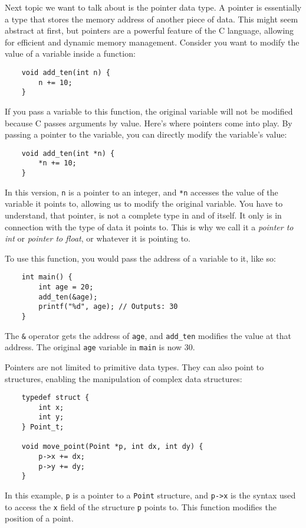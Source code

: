 \documentclass{dcbl/challenge}
\begin{document}
\begin{aufgabe}
    Next topic we want to talk about is the pointer data type. 
    A pointer is essentially a type that stores the memory address of another piece of data.
    This might seem abstract at first, but pointers are a powerful feature of the C language, allowing for efficient and dynamic memory management.
    Consider you want to modify the value of a variable inside a function:
\begin{lstlisting}
    void add_ten(int n) {
        n += 10;
    }
\end{lstlisting}
If you pass a variable to this function, the original variable will not be modified because C passes arguments by value. 
Here's where pointers come into play. 
By passing a pointer to the variable, you can directly modify the variable's value:
\begin{lstlisting}
    void add_ten(int *n) {
        *n += 10;
    }
\end{lstlisting}
In this version, \texttt{n} is a pointer to an integer, and \texttt{*n} accesses the value of the variable it points to, allowing us to modify the original variable.
You have to understand, that pointer, is not a complete type in and of itself. 
It only is in connection with the type of data it points to.
This is why we call it a \textit{pointer to int} or \textit{pointer to float}, or whatever it is pointing to.

To use this function, you would pass the address of a variable to it, like so:
\begin{lstlisting}
    int main() {
        int age = 20;
        add_ten(&age);
        printf("%d", age); // Outputs: 30
    }
\end{lstlisting}
The \texttt{\&} operator gets the address of \texttt{age}, and \texttt{add\_ten} modifies the value at that address. 
The original \texttt{age} variable in \texttt{main} is now 30.

Pointers are not limited to primitive data types. They can also point to structures, enabling the manipulation of complex data structures:
\begin{lstlisting}
    typedef struct {
        int x;
        int y;
    } Point_t;

    void move_point(Point *p, int dx, int dy) {
        p->x += dx;
        p->y += dy;
    }
\end{lstlisting}
In this example, \texttt{p} is a pointer to a \texttt{Point} structure, and \texttt{p->x} is the syntax used to access the \texttt{x} field of the structure \texttt{p} points to. This function modifies the position of a point.


\end{aufgabe}
\end{document}
